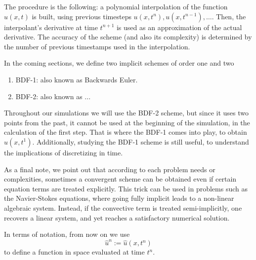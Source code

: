 \documentclass[../main.tex]{subfiles}
\begin{document}
The procedure is the following: a polynomial interpolation of the function $u(x,t)$ is built, 
using previous timesteps $u(x,t^{n}), u(x,t^{n-1}), \ldots$.
Then, the interpolant's derivative at time $t^{n+1}$ is used as an approximation of the actual derivative.
The accuracy of the scheme (and also its complexity) is determined by the number of previous timestamps used in the interpolation. 

In the coming sections, we define two implicit schemes of order one and two
\begin{enumerate}
    \item BDF-1: also known as Backwards Euler.
    \item BDF-2: also known as ... 
\end{enumerate}
Throughout our simulations we will use the BDF-2 scheme, but since it uses two points from the past, 
it cannot be used at the beginning of the simulation, in the calculation of the first step. 
That is where the BDF-1 comes into play, to obtain $u(x,t^1)$.
Additionally, studying the BDF-1 scheme is still useful, to understand the implications of discretizing in time.  

As a final note, we point out that according to each problem needs or complexities, sometimes a convergent scheme can be obtained even if certain equation terms are treated explicitly.
This trick can be used in problems such as the Navier-Stokes equations, where going fully implicit leads to a non-linear algebraic system. 
Instead, if the convective term is treated semi-implicitly, one recovers a linear system, and yet reaches a satisfactory numerical solution.

In terms of notation, from now on we use
\begin{equation}
    \hat{u}^n := \hat{u}(x,t^n)
\end{equation}
to define a function in space evaluated at time $t^n$.
\end{document}
